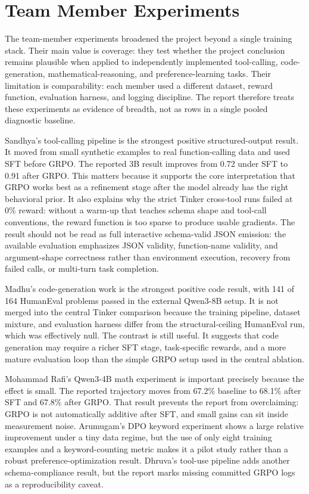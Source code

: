 \documentclass[12pt,a4paper]{report}
\begin{document}
\section{Team Member Experiments}
\label{sec:team-experiments}

The team-member experiments broadened the project beyond a single training stack. Their main value is coverage: they test whether the project conclusion remains plausible when applied to independently implemented tool-calling, code-generation, mathematical-reasoning, and preference-learning tasks. Their limitation is comparability: each member used a different dataset, reward function, evaluation harness, and logging discipline. The report therefore treats these experiments as evidence of breadth, not as rows in a single pooled diagnostic baseline.

Sandhya's tool-calling pipeline is the strongest positive structured-output result. It moved from small synthetic examples to real function-calling data and used SFT before GRPO. The reported 3B result improves from 0.72 under SFT to 0.91 after GRPO. This matters because it supports the core interpretation that GRPO works best as a refinement stage after the model already has the right behavioral prior. It also explains why the strict Tinker cross-tool runs failed at 0\% reward: without a warm-up that teaches schema shape and tool-call conventions, the reward function is too sparse to produce usable gradients. The result should not be read as full interactive schema-valid JSON emission: the available evaluation emphasizes JSON validity, function-name validity, and argument-shape correctness rather than environment execution, recovery from failed calls, or multi-turn task completion.

Madhu's code-generation work is the strongest positive code result, with 141 of 164 HumanEval problems passed in the external Qwen3-8B setup. It is not merged into the central Tinker comparison because the training pipeline, dataset mixture, and evaluation harness differ from the structural-ceiling HumanEval run, which was effectively null. The contrast is still useful. It suggests that code generation may require a richer SFT stage, task-specific rewards, and a more mature evaluation loop than the simple GRPO setup used in the central ablation.

Mohammad Rafi's Qwen3-4B math experiment is important precisely because the effect is small. The reported trajectory moves from 67.2\% baseline to 68.1\% after SFT and 67.8\% after GRPO. That result prevents the report from overclaiming: GRPO is not automatically additive after SFT, and small gains can sit inside measurement noise. Arumugam's DPO keyword experiment shows a large relative improvement under a tiny data regime, but the use of only eight training examples and a keyword-counting metric makes it a pilot study rather than a robust preference-optimization result. Dhruva's tool-use pipeline adds another schema-compliance result, but the report marks missing committed GRPO logs as a reproducibility caveat.
\end{document}
